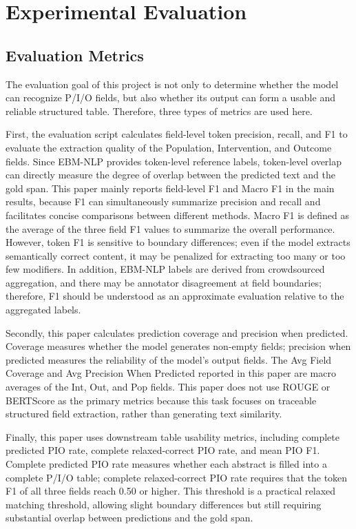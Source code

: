\documentclass{article}
\begin{document}
\section{Experimental Evaluation}
\subsection{Evaluation Metrics}
The evaluation goal of this project is not only to determine whether the model can recognize P/I/O fields, but also whether its output can form a usable and reliable structured table. Therefore, three types of metrics are used here.


First, the evaluation script calculates field-level token precision, recall, and F1 to evaluate the extraction quality of the Population, Intervention, and Outcome fields. Since EBM-NLP provides token-level reference labels, token-level overlap can directly measure the degree of overlap between the predicted text and the gold span. This paper mainly reports field-level F1 and Macro F1 in the main results, because F1 can simultaneously summarize precision and recall and facilitates concise comparisons between different methods. Macro F1 is defined as the average of the three field F1 values to summarize the overall performance. However, token F1 is sensitive to boundary differences; even if the model extracts semantically correct content, it may be penalized for extracting too many or too few modifiers. In addition, EBM-NLP labels are derived from crowdsourced aggregation, and there may be annotator disagreement at field boundaries; therefore, F1 should be understood as an approximate evaluation relative to the aggregated labels.


Secondly, this paper calculates prediction coverage and precision when predicted. Coverage measures whether the model generates non-empty fields; precision when predicted measures the reliability of the model's output fields. The Avg Field Coverage and Avg Precision When Predicted reported in this paper are macro averages of the Int, Out, and Pop fields. This paper does not use ROUGE or BERTScore as the primary metrics because this task focuses on traceable structured field extraction, rather than generating text similarity.


Finally, this paper uses downstream table usability metrics, including complete predicted PIO rate, complete relaxed-correct PIO rate, and mean PIO F1. Complete predicted PIO rate measures whether each abstract is filled into a complete P/I/O table; complete relaxed-correct PIO rate requires that the token F1 of all three fields reach 0.50 or higher. This threshold is a practical relaxed matching threshold, allowing slight boundary differences but still requiring substantial overlap between predictions and the gold span.
\end{document}
